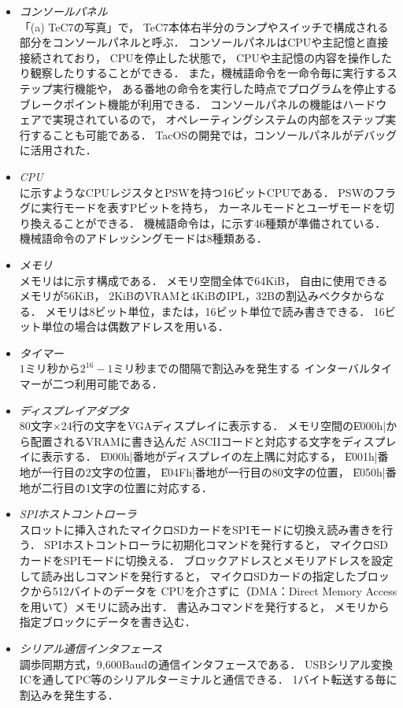 \begin{itemize}
\item \emph{コンソールパネル} \\
  「(a) TeC7の写真」で，
  TeC7本体右半分のランプやスイッチで構成される部分をコンソールパネルと呼ぶ．
  コンソールパネルはCPUや主記憶と直接接続されており，
  CPUを停止した状態で，
  CPUや主記憶の内容を操作したり観察したりすることができる．
  また，機械語命令を一命令毎に実行するステップ実行機能や，
  ある番地の命令を実行した時点でプログラムを停止する
  ブレークポイント機能が利用できる．
  コンソールパネルの機能はハードウェアで実現されているので，
  オペレーティングシステムの内部をステップ実行することも可能である．
  TacOSの開発では，コンソールパネルがデバッグに活用された．
\item \emph{CPU} \\
  に示すようなCPUレジスタとPSWを持つ16ビットCPUである．
  PSWのフラグに実行モードを表すPビットを持ち，
  カーネルモードとユーザモードを切り換えることができる．
  機械語命令は，に示す46種類が準備されている．
  機械語命令のアドレッシングモードは8種類ある．
\item \emph{メモリ} \\
  メモリはに示す構成である．
  メモリ空間全体で64KiB，
  自由に使用できるメモリが56KiB，
  2KiBのVRAMと4KiBのIPL，32Bの割込みベクタからなる．
  メモリは8ビット単位，または，16ビット単位で読み書きできる．
  16ビット単位の場合は偶数アドレスを用いる．
\item \emph{タイマー} \\
  $1$ミリ秒から$2^{16}-1$ミリ秒までの間隔で割込みを発生する
  インターバルタイマーが二つ利用可能である．
\item \emph{ディスプレイアダプタ} \\
  80文字×24行の文字をVGAディスプレイに表示する．
  メモリ空間の\|E000h|から配置されるVRAMに書き込んだ
  ASCIIコードと対応する文字をディスプレイに表示する．
  \|E000h|番地がディスプレイの左上隅に対応する，
  \|E001h|番地が一行目の2文字の位置，
  \|E04Fh|番地が一行目の80文字の位置，
  \|E050h|番地が二行目の1文字の位置に対応する．
\item \emph{SPIホストコントローラ} \\
  スロットに挿入されたマイクロSDカードをSPIモードに切換え読み書きを行う．
  SPIホストコントローラに初期化コマンドを発行すると，
  マイクロSDカードをSPIモードに切換える．
  ブロックアドレスとメモリアドレスを設定して読み出しコマンドを発行すると，
  マイクロSDカードの指定したブロックから512バイトのデータを
  CPUを介さずに（DMA：Direct Memory Accessを用いて）メモリに読み出す．
  書込みコマンドを発行すると，
  メモリから指定ブロックにデータを書き込む．
\item \emph{シリアル通信インタフェース} \\
  調歩同期方式，9,600Baudの通信インタフェースである．
  USBシリアル変換ICを通してPC等のシリアルターミナルと通信できる．
  1バイト転送する毎に割込みを発生する．
\end{itemize}

